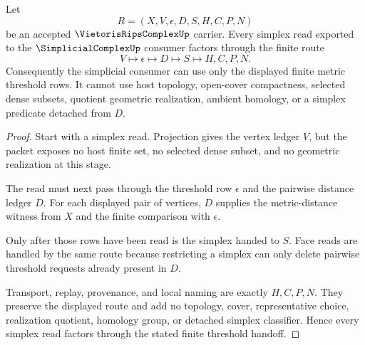\begin{theorem}
\label{thm:vietoris-rips-complex-simplex-threshold-handoff}
Let
$$
R=(X,V,\epsilon,D,S,H,C,P,N)
$$
be an accepted $\VietorisRipsComplexUp$ carrier. Every simplex read exported to the $\SimplicialComplexUp$ consumer factors through the finite route
$$
V\longmapsto \epsilon\longmapsto D\longmapsto S\longmapsto H,C,P,N .
$$
Consequently the simplicial consumer can use only the displayed finite metric threshold rows. It cannot use host topology, open-cover compactness, selected dense subsets, quotient geometric realization, ambient homology, or a simplex predicate detached from $D$.
\end{theorem}
\begin{proof}
Start with a simplex read. Projection gives the vertex ledger $V$, but the packet exposes no host finite set, no selected dense subset, and no geometric realization at this stage.

The read must next pass through the threshold row $\epsilon$ and the pairwise distance ledger $D$. For each displayed pair of vertices, $D$ supplies the metric-distance witness from $X$ and the finite comparison with $\epsilon$.

Only after those rows have been read is the simplex handed to $S$. Face reads are handled by the same route because restricting a simplex can only delete pairwise threshold requests already present in $D$.

Transport, replay, provenance, and local naming are exactly $H,C,P,N$. They preserve the displayed route and add no topology, cover, representative choice, realization quotient, homology group, or detached simplex classifier. Hence every simplex read factors through the stated finite threshold handoff.
\end{proof}


